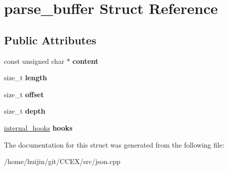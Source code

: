 \hypertarget{structparse__buffer}{\section{parse\-\_\-buffer Struct Reference}
\label{structparse__buffer}
}
\subsection*{Public Attributes}
\begin{DoxyCompactItemize}
\item 
\hypertarget{structparse__buffer_a52ee1184576baa3d5171059ab0e942de}{const unsigned char $\ast$ {\bfseries content}}\label{structparse__buffer_a52ee1184576baa3d5171059ab0e942de}

\item 
\hypertarget{structparse__buffer_a036970e9335896d3cee8459eda9e2eb9}{size\-\_\-t {\bfseries length}}\label{structparse__buffer_a036970e9335896d3cee8459eda9e2eb9}

\item 
\hypertarget{structparse__buffer_af727920073077579942a79de519bb31a}{size\-\_\-t {\bfseries offset}}\label{structparse__buffer_af727920073077579942a79de519bb31a}

\item 
\hypertarget{structparse__buffer_af613c4ed7d73f76c60c50d1bcf4c67a0}{size\-\_\-t {\bfseries depth}}\label{structparse__buffer_af613c4ed7d73f76c60c50d1bcf4c67a0}

\item 
\hypertarget{structparse__buffer_a2c3e99b15da2935fc5d58124ffb4a894}{\hyperlink{structinternal__hooks}{internal\-\_\-hooks} {\bfseries hooks}}\label{structparse__buffer_a2c3e99b15da2935fc5d58124ffb4a894}

\end{DoxyCompactItemize}


The documentation for this struct was generated from the following file\-:\begin{DoxyCompactItemize}
\item 
/home/huijin/git/\-C\-C\-E\-X/src/json.\-cpp\end{DoxyCompactItemize}
